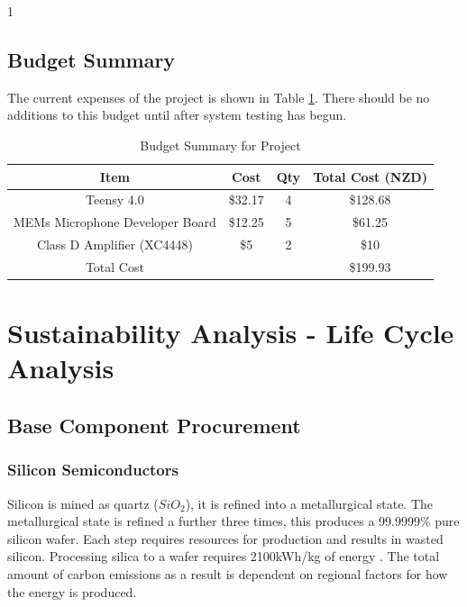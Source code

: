 1\documentclass{article}
\begin{document}
\subsection{Budget Summary}

The current expenses of the project is shown in Table \ref{tab:budget}. There should be no additions to this budget until after system testing has begun.

\begin{center}
	\begin{table} [H]
	\centering
		\caption{Budget Summary for Project}
		\begin{tabular}{|c |c c c|}
			\hline
			Item & Cost & Qty & Total Cost (NZD)\\
			\hline\hline
			Teensy 4.0 & \$32.17 & 4 & \$128.68\\
			MEMs Microphone Developer Board & \$12.25 & 5 & \$61.25\\
			Class D Amplifier (XC4448) & \$5 & 2 & \$10\\
			\hline\hline
			Total Cost & &  & \$199.93\\
			\hline
		\end{tabular}

		\label{tab:budget}
	\end{table}
\end{center}


\pagebreak
\section{Sustainability Analysis - Life Cycle Analysis}
\subsection{Base Component Procurement}
\subsubsection{Silicon Semiconductors}
Silicon is mined as quartz ($SiO_2$), it is refined into a metallurgical state. The metallurgical state is refined a further three times, this produces a 99.9999\% pure silicon wafer. Each step requires resources for production and results in wasted silicon. Processing silica to a wafer requires 2100kWh/kg of energy \cite{siliconLCA}. The total amount of carbon emissions as a result is dependent on regional factors for how the energy is produced.
\end{document}
